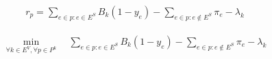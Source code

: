 \documentclass[english]{beamer}
\begin{document}
\begin{frame}
\begin{columns}
\begin{column}{0.4\textwidth}
  \pause

  \begin{align}
    r_{p} = \sum\limits_{e \in p : e \in E^S} B_{k} (1 - y_{e}) - \sum\limits_{e \in p : e \notin E^S} \pi_e - \lambda_{k} \nonumber
  \end{align}

  \pause

  \begin{align}
    \min_{ \forall k \in E^{V}, \forall p \in P^{k}}  \quad  \sum\limits_{e \in p : e \in E^S} B_{k} (1 - y_{e}) - \sum\limits_{e \in p : e \notin E^S} \pi_{e}-\lambda_{k} \nonumber
  \end{align}
\end{column}
\end{columns}

\end{frame}
\end{document}

